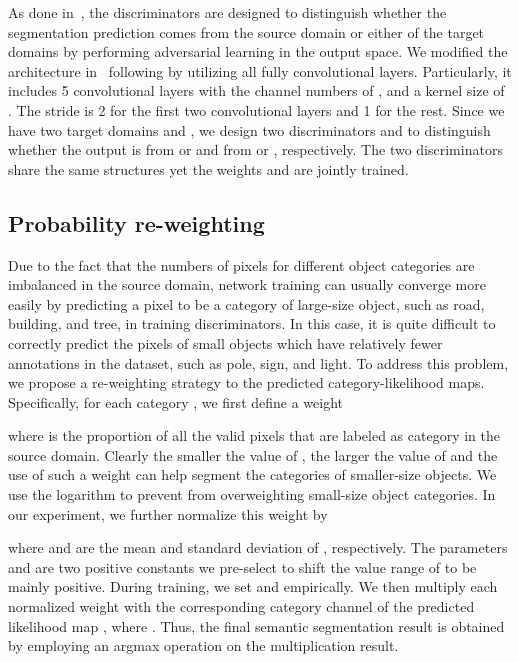 \documentclass[final]{cvpr}
\begin{document}
\vspace{0.1cm}
\hspace{0.2cm}
As done in~\cite{tsai2018learning}, the discriminators are designed to distinguish whether the segmentation prediction comes from the source domain or either of the target domains by performing adversarial learning in the output space. 
We modified the architecture in~\cite{radford2015unsupervised} following \cite{tsai2018learning} by utilizing all fully convolutional layers. 
Particularly, it includes 5 convolutional layers with the channel numbers of , and a kernel size of . 
The stride is 2 for the first two convolutional layers and 1 for the rest.
Since we have two target domains  and , we design two discriminators  and  to distinguish whether the output is from  or  and from  or , respectively.
The two discriminators share the same structures yet the weights and are jointly trained.  

\subsection{Probability re-weighting} \hspace{0.2cm}
Due to the fact that the numbers of pixels for different object categories are imbalanced in the source domain, 
network training can usually converge more easily by predicting a pixel to be a category of large-size object, such as road, building, and tree, in training discriminators.
In this case, it is quite difficult to correctly predict the pixels of small objects which have relatively fewer annotations in the dataset, such as pole, sign, and light. 
To address this problem, we propose a re-weighting strategy to the predicted category-likelihood maps.
Specifically, for each category , we first define a weight

where  is the proportion of all the valid pixels that are labeled as category  in the source domain. 
Clearly the smaller the value of , the larger the value of  and the use of such a weight can help segment the categories of smaller-size objects.
We use the logarithm to prevent from overweighting small-size object categories.
In our experiment, we further normalize this weight by

where  and  are the mean and standard deviation of , respectively. The parameters 
 and  are two positive constants we pre-select to shift the value range of  to be mainly positive.
During training, we set  and  empirically. 
We then multiply each normalized weight  with the corresponding category channel of the predicted likelihood map , where .
Thus, the final semantic segmentation result  is obtained by employing an argmax operation on the multiplication result.
\end{document}
